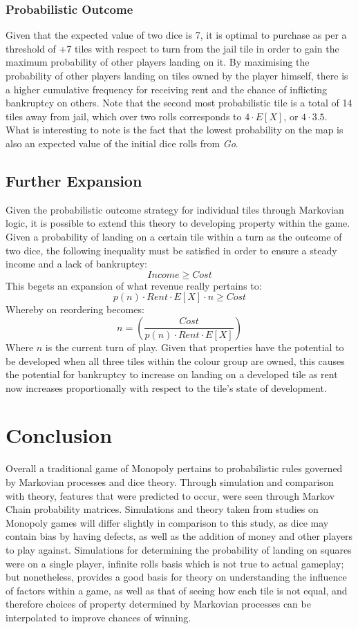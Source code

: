 \documentclass[12pt]{article}
\begin{document}
\subsubsection{Probabilistic Outcome}
Given that the expected value of two dice is 7, it is optimal to purchase as per a threshold of +7 tiles with respect to turn from the jail tile in order to gain the maximum probability of other players landing on it. By maximising the probability of other players landing on tiles owned by the player himself, there is a higher cumulative frequency for receiving rent and the chance of inflicting bankruptcy on others.\cite{bradym} Note that the second most probabilistic tile is a total of 14 tiles away from jail, which over two rolls corresponds to $4 \cdot E[X]$, or $4\cdot 3.5$. What is interesting to note is the fact that the lowest probability on the map is also an expected value of the initial dice rolls from \emph{Go}.

\subsection{Further Expansion}
Given the probabilistic outcome strategy for individual tiles through Markovian logic, it is possible to extend this theory to developing property within the game. Given a probability of landing on a certain tile within a turn as the outcome of two dice, the following inequality must be satisfied in order to ensure a steady income and a lack of bankruptcy:
$$Income \geq Cost$$
This begets an expansion of what revenue really pertains to:
$$p(n)\cdot Rent\cdot E[X] \cdot n \geq Cost$$
Whereby on reordering becomes:
$$n = \left(\frac{Cost}{p(n)\cdot Rent\cdot E[X]}\right)$$
Where $n$ is the current turn of play. Given that properties have the potential to be developed when all three tiles within the colour group are owned, this causes the potential for bankruptcy to increase on landing on a developed tile as rent now increases proportionally with respect to the tile's state of development.
\clearpage
\section{Conclusion}
Overall a traditional game of Monopoly pertains to probabilistic rules governed by Markovian processes and dice theory. Through simulation and comparison with theory, features that were predicted to occur, were seen through Markov Chain probability matrices. Simulations and theory taken from studies on Monopoly games will differ slightly in comparison to this study, as dice may contain bias by having defects, as well as the addition of money and other players to play against. Simulations for determining the probability of landing on squares were on a single player, infinite rolls basis which is not true to actual gameplay; but nonetheless, provides a good basis for theory on understanding the influence of factors within a game, as well as that of seeing how each tile is not equal, and therefore choices of property determined by Markovian processes can be interpolated to improve chances of winning.
\end{document}
